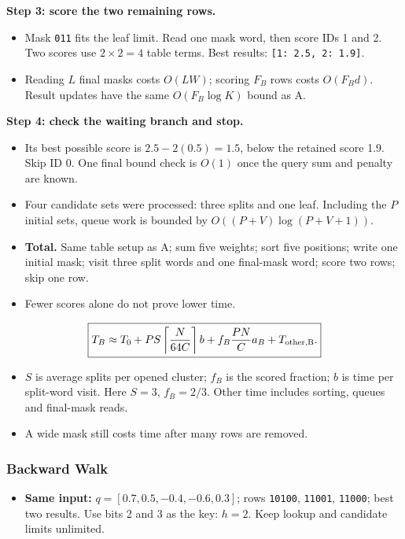 \textbf{Step 3: score the two remaining rows.}
\begin{itemize}
\item Mask \texttt{011} fits the leaf limit. Read one mask word, then score IDs 1 and 2. Two scores use $2\times2=4$ table terms. Best results: \texttt{[1: 2.5, 2: 1.9]}.
\item Reading $L$ final masks costs $O(LW)$; scoring $F_B$ rows costs $O(F_Bd)$.
Result updates have the same $O(F_B\log K)$ bound as A.
\end{itemize}

\textbf{Step 4: check the waiting branch and stop.}
\begin{itemize}
\item Its best possible score is $2.5-2(0.5)=1.5$, below the retained score 1.9. Skip ID 0. One final bound check is $O(1)$ once the query sum and penalty are known.
\item Four candidate sets were processed: three splits and one leaf. Including the $P$ initial sets, queue work is bounded by
$O((P+V)\log(P+V+1))$.
\end{itemize}

\begin{itemize}
\item \textbf{Total.} Same table setup as A; sum five weights; sort five positions; write one initial mask; visit three split words and one final-mask word; score two rows; skip one row.
\item Fewer scores alone do not prove lower time.
\end{itemize}
\[
 \boxed{T_B\approx T_0+PS\left\lceil \frac{N}{64C}\right\rceil b
             +f_B\frac{PN}{C}a_B+T_{\rm other,B}.}
\]
\begin{itemize}
\item $S$ is average splits per opened cluster; $f_B$ is the scored fraction; $b$ is time per split-word visit. Here $S=3$, $f_B=2/3$. Other time includes sorting, queues and final-mask reads.
\item A wide mask still costs time after many rows are removed.
\end{itemize}

\newpage
\subsubsection{Backward Walk}
\begin{itemize}
\item \textbf{Same input:} $q=[0.7,0.5,-0.4,-0.6,0.3]$; rows \texttt{10100}, \texttt{11001}, \texttt{11000}; best two results. Use bits 2 and 3 as the key: $h=2$. Keep lookup and candidate limits unlimited.
\end{itemize}

